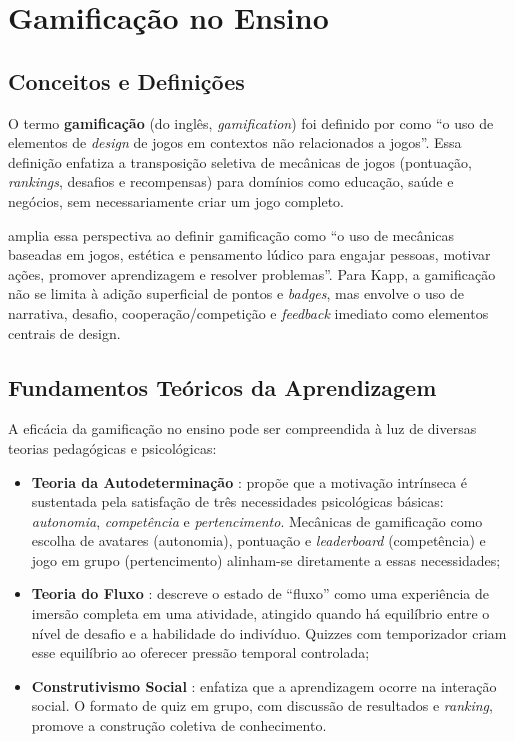 \documentclass[
	12pt,
	openany,
	oneside,
	a4paper,
	english,
	brazil
]{abntex2}
\begin{document}
\section{Gamificação no Ensino}\label{sec:gamificacao}
 
\subsection{Conceitos e Definições}
 
O termo \textbf{gamificação} (do inglês, \textit{gamification}) foi definido por  como ``o uso de elementos de \textit{design} de jogos em contextos não relacionados a jogos''. Essa definição enfatiza a transposição seletiva de mecânicas de jogos (pontuação, \textit{rankings}, desafios e recompensas) para domínios como educação, saúde e negócios, sem necessariamente criar um jogo completo.
 
 amplia essa perspectiva ao definir gamificação como ``o uso de mecânicas baseadas em jogos, estética e pensamento lúdico para engajar pessoas, motivar ações, promover aprendizagem e resolver problemas''. Para Kapp, a gamificação não se limita à adição superficial de pontos e \textit{badges}, mas envolve o uso de narrativa, desafio, cooperação/competição e \textit{feedback} imediato como elementos centrais de design.
 
\subsection{Fundamentos Teóricos da Aprendizagem}
 
A eficácia da gamificação no ensino pode ser compreendida à luz de diversas teorias pedagógicas e psicológicas:
 
\begin{itemize}
  \item \textbf{Teoria da Autodeterminação} \cite{guimaraes2004}: propõe que a motivação intrínseca é sustentada pela satisfação de três necessidades psicológicas básicas: \textit{autonomia}, \textit{competência} e \textit{pertencimento}. Mecânicas de gamificação como escolha de avatares (autonomia), pontuação e \textit{leaderboard} (competência) e jogo em grupo (pertencimento) alinham-se diretamente a essas necessidades;
 
  \item \textbf{Teoria do Fluxo} \cite{csikszentmihalyi1990}: descreve o estado de ``fluxo'' como uma experiência de imersão completa em uma atividade, atingido quando há equilíbrio entre o nível de desafio e a habilidade do indivíduo. Quizzes com temporizador criam esse equilíbrio ao oferecer pressão temporal controlada;
 
  \item \textbf{Construtivismo Social} \cite{vygotsky1984}: enfatiza que a aprendizagem ocorre na interação social. O formato de quiz em grupo, com discussão de resultados e \textit{ranking}, promove a construção coletiva de conhecimento.
\end{itemize}
 
\end{document}
